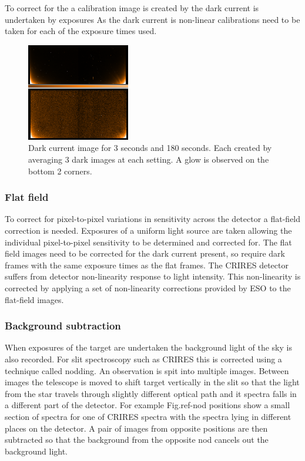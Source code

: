 To correct for the a calibration image is created by  the dark current is undertaken by exposures
As the dark current is non-linear calibrations need to be taken for each of the exposure times used. 


\begin{figure}
\includegraphics[width=0.4\textwidth]{figures/reduction/Master_Darks.png}
\caption{Dark current image for 3 seconds and 180 seconds. Each created by averaging 3 dark images at each setting. A glow is observed on the bottom 2 corners.}
\end{figure}



\subsubsection{Flat field}
To correct for pixel-to-pixel variations in sensitivity across the detector a flat-field correction is needed. Exposures of a uniform light source are taken allowing the individual pixel-to-pixel sensitivity to be determined and corrected for. The flat field images need to be corrected for the dark current present, so require dark frames with the same exposure times as the flat frames.
The CRIRES detector suffers from detector non-linearity response to light intensity. This non-linearity is corrected by applying a set of non-linearity corrections provided by ESO to the flat-field images.  


\subsubsection{Background subtraction}

When exposures of the target are undertaken the background light of the sky is also recorded. For slit spectroscopy such as CRIRES this is corrected using a technique called nodding. An observation is spit into multiple images. Between images the telescope is moved to shift target vertically in the slit so that the light from the star travels through slightly different optical path and it spectra falls in a different part of the detector. 
For example Fig.ref-nod positions show a small section of spectra for one of CRIRES spectra with the spectra lying in different places on the detector. A pair of images from opposite positions are then subtracted so that the background from the opposite nod cancels out the background light.

